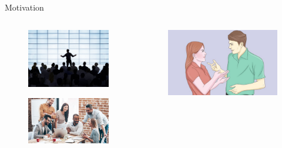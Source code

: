 \documentclass[10pt,a4paper,openany]{beamer}
\begin{document}
	\begin{frame}{Motivation}
		\begin{columns}
			\begin{column}{0.5\textwidth}
				\begin{figure}[htbp]
					\centerline{\includegraphics[scale=0.8]{charts/motivation.jpg}}
					\label{fig_motivation1} \pause
				\end{figure} 
				\begin{figure}[htbp]
					\centerline{\includegraphics[scale=0.15]{charts/motivation2.jpg}}
					\label{fig_motivation2} \pause
				\end{figure} 
			\end{column}
			\begin{column}{0.5\textwidth}
				\begin{figure}[htbp]
					\centerline{\includegraphics[scale=0.15]{charts/motivation4.png}}

\end{figure}
\end{column}
\end{columns}
\end{frame}
\end{document}

